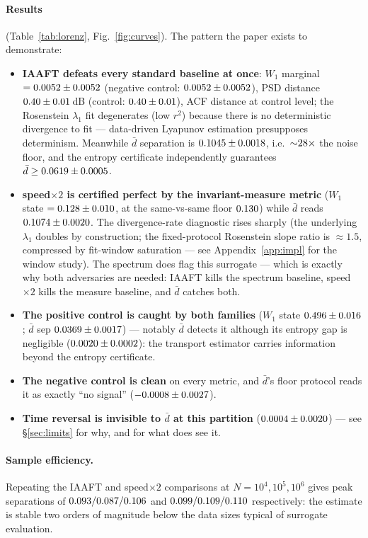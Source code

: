 \documentclass[11pt]{article}
\newcommand{\dbar}{\bar d}
\begin{document}
\paragraph{Results} (Table~\ref{tab:lorenz}, Fig.~\ref{fig:curves}). The pattern the
paper exists to demonstrate:
\begin{itemize}\itemsep2pt
\item \textbf{IAAFT defeats every standard baseline at once}: $W_1$ marginal
$=0.0052 \pm 0.0052$ (negative control: $0.0052 \pm 0.0052$), PSD distance $0.40 \pm 0.01$\,dB
(control: $0.40 \pm 0.01$), ACF distance at control level; the Rosenstein $\lambda_1$ fit
degenerates (low $r^2$) because there is no deterministic divergence to fit ---
data-driven Lyapunov estimation presupposes determinism. Meanwhile
$\dbar$ separation is $0.1045 \pm 0.0018$, i.e.\ ${\sim}28\times$ the noise
floor, and the entropy certificate independently guarantees $\dbar\ge\lorIaaftFano$.
\item \textbf{speed$\times2$ is certified perfect by the invariant-measure metric}
($W_1$ state $=0.128 \pm 0.010$, at the same-vs-same floor $0.130$)
while $\dbar$ reads $0.1074 \pm 0.0020$. The divergence-rate diagnostic rises sharply
(the underlying $\lambda_1$ doubles by construction; the fixed-protocol Rosenstein
slope ratio is $\approx1.5$, compressed by fit-window saturation --- see
Appendix~\ref{app:impl} for the window study). The spectrum does flag this surrogate
--- which is exactly why both adversaries are needed: IAAFT kills the spectrum
baseline, speed$\times2$ kills the measure baseline, and $\dbar$ catches both.
\item \textbf{The positive control is caught by both families} ($W_1$ state
$0.496 \pm 0.016$; $\dbar$ sep $0.0369 \pm 0.0017$) --- notably $\dbar$ detects it although
its entropy gap is negligible ($0.0020 \pm 0.0002$): the transport estimator carries
information beyond the entropy certificate.
\item \textbf{The negative control is clean} on every metric, and $\dbar$'s floor
protocol reads it as exactly ``no signal'' ($-0.0008 \pm 0.0027$).
\item \textbf{Time reversal is invisible to $\dbar$ at this partition}
($0.0004 \pm 0.0020$) --- see \S\ref{sec:limits} for why, and for what does see it.
\end{itemize}

\paragraph{Sample efficiency.} Repeating the IAAFT and speed$\times2$ comparisons at
$N=10^4,10^5,10^6$ gives peak separations of $0.093/0.087/0.106$ and
$0.099/0.109/0.110$ respectively: the estimate is stable two orders of
magnitude below the data sizes typical of surrogate evaluation.
\end{document}
